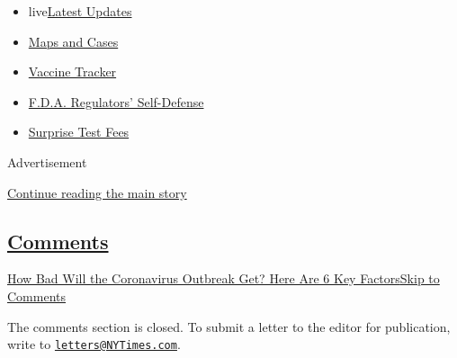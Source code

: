 \begin{itemize}
\tightlist
\item
  live\href{https://www.nytimes3xbfgragh.onion/2020/09/11/world/covid-19-coronavirus.html?name=styln-coronavirus-national\&region=TOP_BANNER\&block=storyline_menu_recirc\&action=click\&pgtype=Interactive\&impression_id=953d71d1-f4c8-11ea-b924-e5b48aa72b34\&variant=undefined}{Latest
  Updates}
\item
  \href{https://www.nytimes3xbfgragh.onion/interactive/2020/us/coronavirus-us-cases.html?name=styln-coronavirus-national\&region=TOP_BANNER\&block=storyline_menu_recirc\&action=click\&pgtype=Interactive\&impression_id=953d98e0-f4c8-11ea-b924-e5b48aa72b34\&variant=undefined}{Maps
  and Cases}
\item
  \href{https://www.nytimes3xbfgragh.onion/interactive/2020/science/coronavirus-vaccine-tracker.html?name=styln-coronavirus-national\&region=TOP_BANNER\&block=storyline_menu_recirc\&action=click\&pgtype=Interactive\&impression_id=953d98e1-f4c8-11ea-b924-e5b48aa72b34\&variant=undefined}{Vaccine
  Tracker}
\item
  \href{https://www.nytimes3xbfgragh.onion/2020/09/10/us/politics/fda-coronavirus-vaccine.html?name=styln-coronavirus-national\&region=TOP_BANNER\&block=storyline_menu_recirc\&action=click\&pgtype=Interactive\&impression_id=953d98e2-f4c8-11ea-b924-e5b48aa72b34\&variant=undefined}{F.D.A.
  Regulators' Self-Defense}
\item
  \href{https://www.nytimes3xbfgragh.onion/2020/09/09/upshot/coronavirus-surprise-test-fees.html?name=styln-coronavirus-national\&region=TOP_BANNER\&block=storyline_menu_recirc\&action=click\&pgtype=Interactive\&impression_id=953d98e3-f4c8-11ea-b924-e5b48aa72b34\&variant=undefined}{Surprise
  Test Fees}
\end{itemize}

Advertisement

\protect\hyperlink{after-top}{Continue reading the main story}

\hypertarget{comments}{%
\subsection{\texorpdfstring{\protect\hyperlink{commentsContainer}{Comments}}{Comments}}\label{comments}}

\href{}{How Bad Will the Coronavirus Outbreak Get? Here Are 6 Key
Factors}\href{}{Skip to Comments}

The comments section is closed. To submit a letter to the editor for
publication, write to
\href{mailto:letters@NYTimes.com}{\nolinkurl{letters@NYTimes.com}}.

